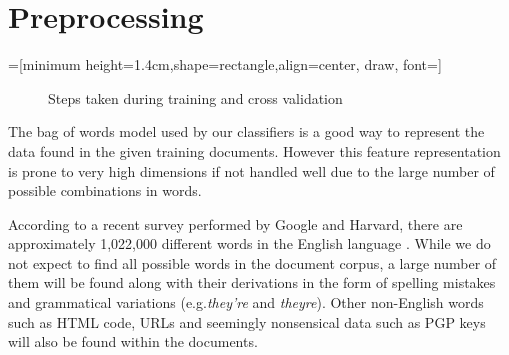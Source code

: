 \section{Preprocessing}
=[minimum height=1.4cm,shape=rectangle,align=center, draw, font=\small]
\begin{figure}[t]
    \caption{Steps taken during training and cross validation}
    \label{fig:steps}
\end{figure}

The bag of words model used by our classifiers is a good way to represent the data found in the given training documents. However this feature representation is prone to very high dimensions if not handled well due to the large number of possible combinations in words. 

According to a recent survey performed by Google and Harvard, there are approximately 1,022,000 different words in the English language \cite{google2010words}. While we do not expect to find all possible words in the document corpus, a large number of them will be found along with their derivations in the form of spelling mistakes and grammatical variations (e.g.{\it they're} and {\it theyre}). Other non-English words such as HTML code, URLs and seemingly nonsensical data such as PGP keys will also be found within the documents.

